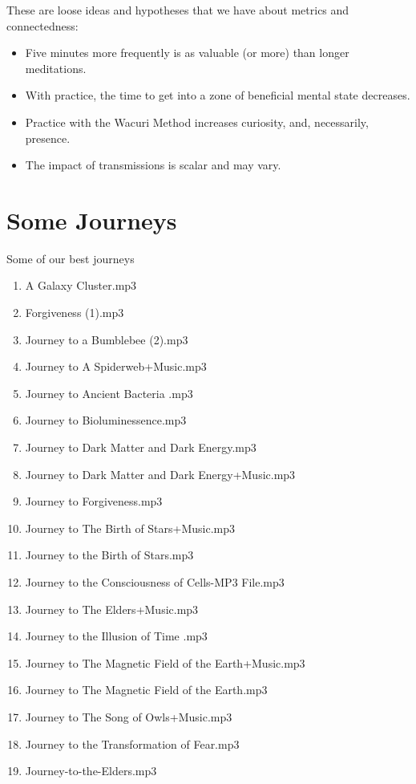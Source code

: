 \documentclass[12pt]{book}
\begin{document}
These are loose ideas and hypotheses that we have about metrics and connectedness:
\begin{itemize}
\item Five minutes more frequently is as valuable (or more) than longer meditations.
\item With practice, the time to get into a zone of beneficial mental state decreases.
\item Practice with the Wacuri Method increases curiosity, and, necessarily, presence.
  \item The impact of transmissions is scalar and may vary.
  \end{itemize}

\appendix

\chapter{Some Journeys}
\label{sec:journeys}

Some of our best journeys
\begin{enumerate}
\item A Galaxy Cluster.mp3
\item Forgiveness (1).mp3
\item Journey to a Bumblebee (2).mp3
\item Journey to A Spiderweb+Music.mp3
\item Journey to Ancient Bacteria .mp3
\item Journey to Bioluminessence.mp3
\item Journey to Dark Matter and Dark Energy.mp3
\item Journey to Dark Matter and Dark Energy+Music.mp3
\item Journey to Forgiveness.mp3
\item Journey to The Birth of Stars+Music.mp3
\item Journey to the Birth of Stars.mp3
\item Journey to the Consciousness of Cells-MP3 File.mp3
\item Journey to The Elders+Music.mp3
\item Journey to the Illusion of Time .mp3
\item Journey to The Magnetic Field of the Earth+Music.mp3
\item Journey to The Magnetic Field of the Earth.mp3
\item Journey to The Song of Owls+Music.mp3
\item Journey to the Transformation of Fear.mp3
\item Journey-to-the-Elders.mp3
\end{enumerate}

  
\end{document}
